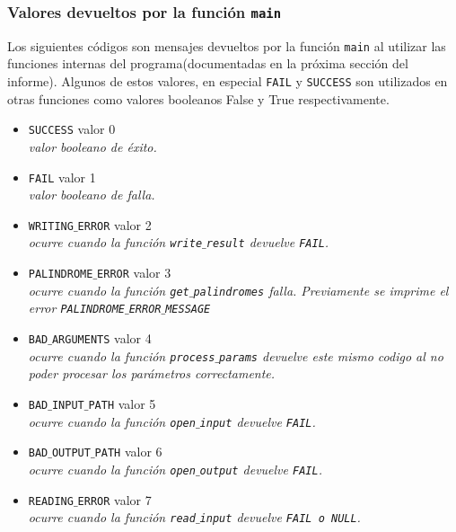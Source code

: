 \documentclass[a4paper, 10pt]{article}
\def\code#1{\texttt{#1}}
\begin{document}
		\subsubsection{Valores devueltos por la función \code{main}}
			Los siguientes códigos son mensajes devueltos por la función \code{main} al utilizar las funciones
			internas del programa(documentadas en la próxima sección del informe). Algunos de estos valores,
			en especial \code{FAIL} y \code{SUCCESS} son utilizados en otras funciones como valores booleanos
			False y True respectivamente. 
			\begin{itemize}
				\item \code{SUCCESS} valor 0
					\\\textit{valor booleano de éxito.}
				\item \code{FAIL} valor 1
					\\\textit{valor booleano de falla.}							
				\item \code{WRITING$\_$ERROR} valor 2
					\\\textit{ocurre cuando la función \code{write$\_$result} devuelve \code{FAIL}.}
				\item \code{PALINDROME$\_$ERROR} valor 3
					\\\textit{ocurre cuando la función \code{get$\_$palindromes} falla. Previamente se
					imprime el error \code{PALINDROME$\_$ERROR$\_$MESSAGE}}
				\item \code{BAD$\_$ARGUMENTS} valor 4
					\\\textit{ocurre cuando la función \code{process$\_$params} devuelve este mismo 
					codigo al no poder procesar los parámetros correctamente.}
				\item \code{BAD$\_$INPUT$\_$PATH} valor 5
					\\\textit{ocurre cuando la función \code{open$\_$input} devuelve \code{FAIL}.}
				\item \code{BAD$\_$OUTPUT$\_$PATH} valor 6
					\\\textit{ocurre cuando la función \code{open$\_$output} devuelve \code{FAIL}.}
				\item \code{READING$\_$ERROR} valor 7
					\\\textit{ocurre cuando la función \code{read$\_$input} devuelve \code{FAIL o NULL}.}
			\end{itemize}	
\end{document}
